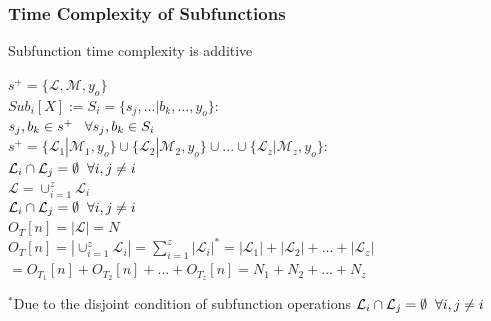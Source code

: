 \documentclass[11pt]{article}
\begin{document}
\subsubsection{Time Complexity of Subfunctions}
Subfunction time complexity is additive
\begin{center}
$
s^+ = \{ \mathcal{L},\mathcal{M},y_o\}
$
\\ \vspace{6mm}
$
Sub_i[X] := S_i = \{s_j,...|b_k,...,y_o\}:
$
\\ \vspace{2mm}
$
s_j,b_k \in s^+ \hspace{3mm} \forall s_j,b_k \in S_i
$
\\ \vspace{6mm}
$
s^+ = \{ \mathcal{L}_1| \mathcal{M}_1,y_o\} \cup \{  \mathcal{L}_2| \mathcal{M}_2,y_o\} \cup ... \cup \{  \mathcal{L}_z| \mathcal{M}_z,y_o\} :
$
\\ \vspace{2mm}
$
\mathcal{L}_i \cap \mathcal{L}_j = \emptyset \hspace{2mm} \forall i,j\neq i
$
\\ \vspace{6mm}
$
\mathcal{L} = \cup_{i=1}^z \mathcal{L}_i
$
\\ \vspace{2mm}
$
\mathcal{L}_i \cap \mathcal{L}_j = \emptyset \hspace{2mm} \forall i,j\neq i
$
\\ \vspace{6mm}
$
O_T[n] = |\mathcal{L}| = N
$
\\ \vspace{2mm}
$
O_T[n]  =  |\cup_{i=1}^z \mathcal{L}_i| = \sum_{i=1}^z |\mathcal{L}_i|^*=|\mathcal{L}_1| + |\mathcal{L}_2|  + ... + |\mathcal{L}_z| 
$
\\ \vspace{2mm}
$
= O_{T_1}[n] + O_{T_2}[n] + ... + O_{T_z}[n] =  N_1 + N_2 + ... + N_z
$
\end{center}
\vspace{4mm}
$^*$Due to the disjoint condition of subfunction operations $\mathcal{L}_i \cap \mathcal{L}_j = \emptyset \hspace{2mm} \forall i,j\neq i$
\end{document}
